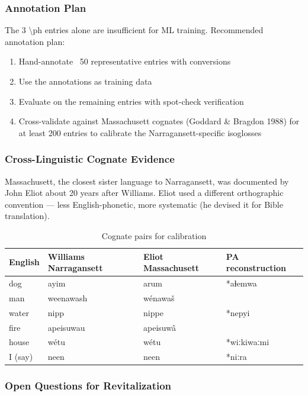 \subsubsection{Annotation Plan}

The 3 \textbackslash ph entries alone are insufficient for ML training.
Recommended annotation plan:

\begin{enumerate}
  \item Hand-annotate ~50 representative entries with conversions
  \item Use the annotations as training data
  \item Evaluate on the remaining entries with spot-check verification
  \item Cross-validate against Massachusett cognates (Goddard \& Bragdon 1988)
    for at least 200 entries to calibrate the Narragansett-specific isoglosses
\end{enumerate}

\subsubsection{Cross-Linguistic Cognate Evidence}

Massachusett, the closest sister language to Narragansett, was documented by
John Eliot about 20 years after Williams. Eliot used a different orthographic
convention --- less English-phonetic, more systematic (he devised it for Bible
translation).

\begin{table}[h]
\centering
\begin{tabular}{llll}
\toprule
English & Williams Narragansett & Eliot Massachusett & PA reconstruction \\
\midrule
dog & ayim & arum & *aɬemwa \\
man & weenawash & wénawaš & \\
water & nipp & nippe & *nepyi \\
fire & apeisuwau & apeisuwâ & \\
house & wétu & wétu & *wiːkiwaːmi \\
I (say) & neen & neen & *niːra \\
\bottomrule
\end{tabular}
\caption{Cognate pairs for calibration}
\label{tab:1362-cognates}
\end{table}

\subsubsection{Open Questions for Revitalization}

